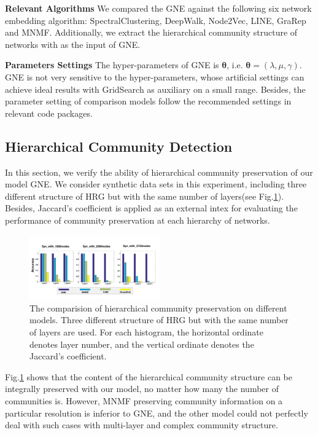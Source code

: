 \documentclass{article}
\theoremstyle{definition}
\begin{document}
	\noindent \textbf{Relevant Algorithms}
	We compared the GNE against the following six network embedding algorithm: SpectralClustering\cite{Tang2011Leveraging}, DeepWalk\cite{Perozzi2014DeepWalk}, Node2Vec\cite{Grover2016node2vec}, LINE\cite{Tang2015LINE}, GraRep\cite{Cao2015GraRep} and MNMF\cite{Wang2017Community}. Additionally, we extract the hierarchical community structure of networks with \cite{Tsvetovat2011Social} as the input of GNE.  

	\noindent \textbf{Parameters Settings} 
	The hyper-parameters of GNE is $\bm{\theta}$, i.e. $\bm{\theta}=(\lambda, \mu, \gamma)$. GNE is not very sensitive to the hyper-parameters, whose artificial settings can achieve ideal results with GridSearch as auxiliary on a small range. Besides, the parameter setting of comparison models follow the recommended settings in relevant code packages.

	\subsection{Hierarchical Community Detection}
	In this section, we verify the ability of hierarchical community preservation of our model GNE. We consider synthetic data sets in this experiment, including three different structure of HRG but with the same number of layers(see Fig.\ref{fig:community_preservation}). Besides, Jaccard's coefficient \cite{halkidi2001clustering} is applied as an external intex for evaluating the performance of community preservation at each hierarchy of networks.

	\begin{figure}[htbp]
		\center
		\includegraphics[width=0.5\textwidth]{figure/community_preservation.pdf}
		\caption{The comparision of hierarchical community preservation on different models. Three different structure of HRG but with the same number of layers are used. For each histogram, the horizontal ordinate denotes layer number, and the vertical ordinate denotes the Jaccard's coefficient.}
		\label{fig:community_preservation}
	\end{figure}
	Fig.\ref{fig:community_preservation} shows that the content of the hierarchical community structure can be integrally preserved with our model, no matter how many the number of communities is. However, MNMF preserving community information on a particular resolution is inferior to GNE, and the other model could not perfectly deal with such cases with multi-layer and complex community structure.
\end{document}
